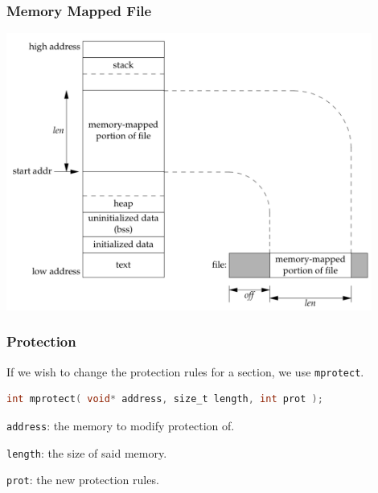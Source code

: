 \begin{frame}
	\frametitle{Memory Mapped File}

	\begin{center}
		\includegraphics[width=0.9\textwidth]{images/memory-mapped-file.png}
	\end{center}

\end{frame}


\begin{frame}[fragile]
	\frametitle{Protection}

	If we wish to change the protection rules for a section, we use \texttt{mprotect}.

	\begin{lstlisting}[language=C]
int mprotect( void* address, size_t length, int prot );
\end{lstlisting}

	\texttt{address}: the memory to modify protection of.

	\texttt{length}: the size of said memory.

	\texttt{prot}: the new protection rules.

\end{frame}


